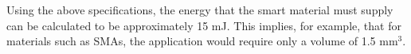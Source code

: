 Using the above specifications, the energy that the smart material must supply can be calculated to be approximately 15 mJ. This implies, for example, that for materials such as SMAs, the application would require only a volume of 1.5 mm$^3$.
%
%
%
%
